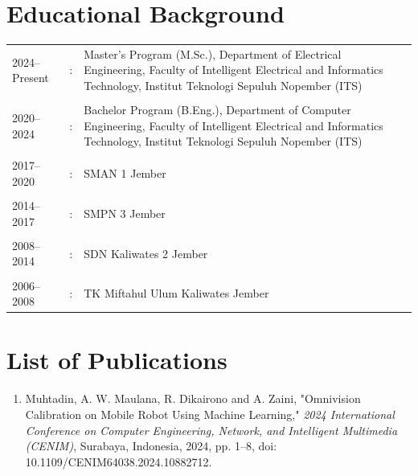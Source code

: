 \section*{Educational Background}
\begin{tabular}{p{3cm}cp{9cm}}
    2024–Present   & :& Master's Program (M.Sc.), Department of Electrical Engineering, Faculty of Intelligent Electrical and Informatics Technology, Institut Teknologi Sepuluh Nopember (ITS) \\
    &&\\
    2020–2024  & :& Bachelor Program (B.Eng.), Department of Computer Engineering, Faculty of Intelligent Electrical and Informatics Technology, Institut Teknologi Sepuluh Nopember (ITS) \\
    &&\\
    2017–2020  & :& SMAN 1 Jember \\
    &&\\
    2014–2017  & :& SMPN 3 Jember \\
    &&\\
    2008–2014  & :& SDN Kaliwates 2 Jember \\
    &&\\
    2006–2008  & :& TK Miftahul Ulum Kaliwates Jember \\
\end{tabular}

\section*{List of Publications}
\begin{enumerate}
    \item Muhtadin, A. W. Maulana, R. Dikairono and A. Zaini, "Omnivision Calibration on Mobile Robot Using Machine Learning," \textit{2024 International Conference on Computer Engineering, Network, and Intelligent Multimedia (CENIM)}, Surabaya, Indonesia, 2024, pp. 1–8, doi: 10.1109/CENIM64038.2024.10882712.
\end{enumerate}

